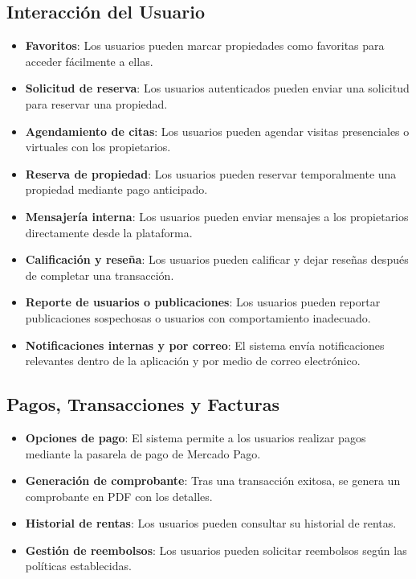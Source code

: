	\subsection*{Interacción del Usuario}
		\begin{itemize}
			\item \textbf{Favoritos}: Los usuarios pueden marcar propiedades como favoritas para acceder fácilmente a ellas.
			\item \textbf{Solicitud de reserva}: Los usuarios autenticados pueden enviar una solicitud para reservar una propiedad.
			\item \textbf{Agendamiento de citas}: Los usuarios pueden agendar visitas presenciales o virtuales con los propietarios.
			\item \textbf{Reserva de propiedad}: Los usuarios pueden reservar temporalmente una propiedad mediante pago anticipado.
			\item \textbf{Mensajería interna}: Los usuarios pueden enviar mensajes a los propietarios directamente desde la plataforma.
			\item \textbf{Calificación y reseña}: Los usuarios pueden calificar y dejar reseñas después de completar una transacción.
			\item \textbf{Reporte de usuarios o publicaciones}: Los usuarios pueden reportar publicaciones sospechosas o usuarios con comportamiento inadecuado.
			\item \textbf{Notificaciones internas y por correo}: El sistema envía notificaciones relevantes dentro de la aplicación y por medio de correo electrónico.
		\end{itemize}
	
	\subsection*{Pagos, Transacciones y Facturas}
		\begin{itemize}
			\item \textbf{Opciones de pago}: El sistema permite a los usuarios realizar pagos mediante la pasarela de pago de Mercado Pago.
			\item \textbf{Generación de comprobante}: Tras una transacción exitosa, se genera un comprobante en PDF con los detalles.
			\item \textbf{Historial de rentas}: Los usuarios pueden consultar su historial de rentas.
			\item \textbf{Gestión de reembolsos}: Los usuarios pueden solicitar reembolsos según las políticas establecidas.
		\end{itemize}
	
